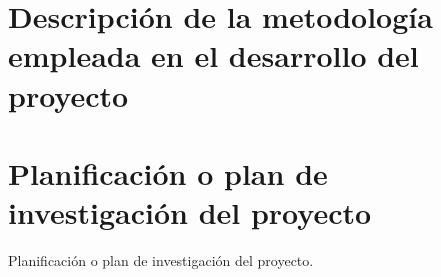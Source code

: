 \newpage

\section{Descripción de la metodología empleada en el desarrollo del proyecto}





\newpage

\section{Planificación o plan de investigación del proyecto}

Planificación o plan de investigación del proyecto.






